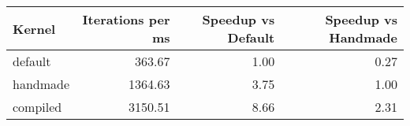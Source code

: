\begin{tabular}{lrrr}
\toprule
Kernel & Iterations per ms & Speedup vs Default & Speedup vs Handmade \\
\midrule
default & 363.67 & 1.00 & 0.27 \\
handmade & 1364.63 & 3.75 & 1.00 \\
compiled & 3150.51 & 8.66 & 2.31 \\
\bottomrule
\end{tabular}
